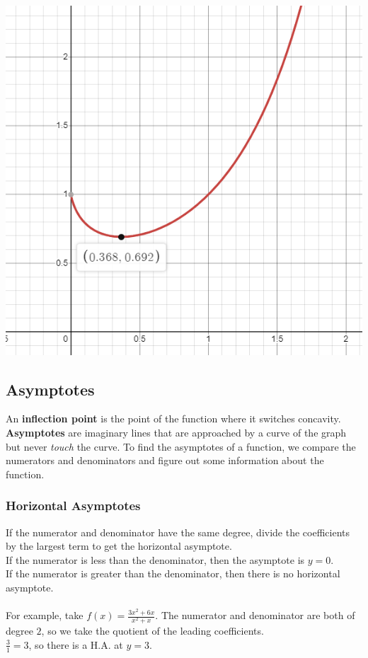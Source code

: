 \documentclass{article}
\begin{document}
\begin{center}
    \includegraphics[scale=0.45]{imgs/xxgraph.png}
\end{center}

\subsection{Asymptotes}
An \textbf{inflection point} is the point of the function where it switches concavity.\\
\textbf{Asymptotes} are imaginary lines that are approached by a curve of the graph but never \textit{touch} the curve. 
To find the asymptotes of a function, we compare the numerators and denominators and figure out some information about the function.
\subsubsection{Horizontal Asymptotes}
If the numerator and denominator have the same degree, divide the coefficients by the largest term to get the horizontal asymptote.\\
If the numerator is less than the denominator, then the asymptote is $y = 0$.\\
If the numerator is greater than the denominator, then there is no horizontal asymptote.\\
\\
For example, take $f(x) = \frac{3x^2 + 6x}{x^2 + x}$. The numerator and denominator are both of degree $2$, so we take the quotient of the leading coefficients.\\
$\frac{3}{1} = 3$, so there is a H.A. at $y = 3$.
\end{document}
